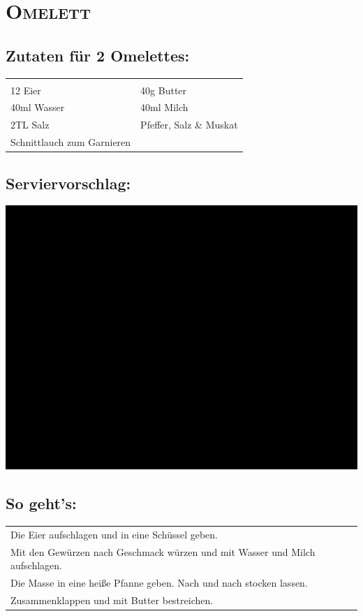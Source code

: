 \section{\textsc{Omelett}}

\subsection*{Zutaten für 2 Omelettes:}

\begin{tabular}{p{7.5cm} p{7.5cm}}
	& \\
	12 Eier & 40g Butter \\
	40ml Wasser & 40ml Milch \\
  2TL Salz & Pfeffer, Salz \& Muskat \\
  Schnittlauch zum Garnieren &
\end{tabular}

\subsection*{Serviervorschlag:}

\includegraphics[width=\textwidth]{img/ph.jpg} \cite{omlett}

\subsection*{So geht's:}

\begin{tabular}{p{15cm}}
	\\
  Die Eier aufschlagen und in eine Schüssel geben.\\
  Mit den Gewürzen nach Geschmack würzen und mit Wasser und Milch aufschlagen. \\
  Die Masse in eine heiße Pfanne geben. Nach und nach stocken lassen.\\
  Zusammenklappen und mit Butter bestreichen.
\end{tabular}
